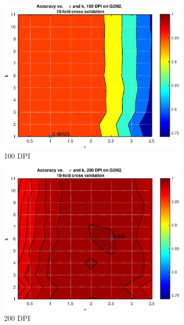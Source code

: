 \begin{figure}
	\centering
	\begin{subfigure}{0.32\textwidth}
		\includegraphics[width = \textwidth]{img/knn-AccVsKVsSigma-G2M2-dpi100-cv10}
		\caption{100 DPI}
	\end{subfigure}
	\begin{subfigure}{0.32\textwidth}
		\includegraphics[width = \textwidth]{img/knn-AccVsKVsSigma-G2M2-dpi200-cv10}
		\caption{200 DPI}
	\end{subfigure}
	\begin{subfigure}{0.32\textwidth}

\end{subfigure}
\end{figure}
